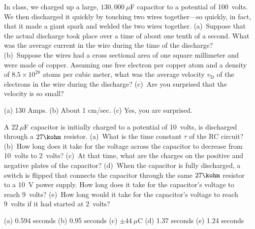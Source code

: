 
\begin{Exercise}
In class, we charged up a large, $130,000~\mu$F capacitor to a potential of 100~volts.  We then discharged it quickly by touching two wires together---so quickly, in fact, that it made a giant spark and welded the two wires together.  
(a)~Suppose that the actual discharge took place over a time of about one tenth of a second.  What was the average current in the wire during the time of the discharge? 
(b)~Suppose the wires had a cross sectional area of one square millimeter and were made of copper.  Assuming one free electron per copper atom and a density of $8.5 \times 10^{28}$ atoms per cubic meter, what was the average velocity $v_\text{D}$ of the electrons in the wire during the discharge? 
(c)~Are you surprised that the velocity is so small?
\end{Exercise}
\begin{Answer}
(a) 130 Amps.  (b) About 1 cm/sec. (c) Yes, you are surprised.
\end{Answer}


\begin{Exercise}
A $22~\mu$F capacitor is initially charged to a potential of 10~volts, is discharged through a $27\kohm$ resistor. 
(a)~What is the time constant $\tau$ of the RC circuit?  
(b)~How long does it take for the voltage across the capacitor to decrease from 10~volts to 2~volts?  
(c)~At that time, what are the charges on the positive and negative plates of the capacitor?  
(d)~When the capacitor is fully discharged, a switch is flipped that connects the capacitor through the same $27\kohm$ resistor to a 10~V power supply.  
How long does it take for the capacitor's voltage to reach 9~volts?  
(e)~How long would it take for the capacitor's voltage to reach 9~volts if it had started at 2~volts? \end{Exercise}
\begin{Answer}
(a) 0.594 seconds (b) 0.95 seconds (c) $\pm44~\mu$C (d) 1.37 seconds (e) 1.24 seconds
\end{Answer}


